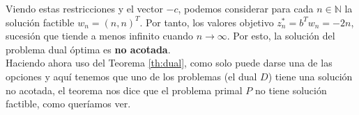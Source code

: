 \documentclass[a4paper]{article}
\begin{document}
Viendo estas restricciones y el vector \(-c\), podemos considerar para cada \(n \in \mathbb N\) la solución factible \(w_{n} = (n,n)^{T}\). Por tanto, los valores objetivo \(z_{n}^{*} = b^{T}w_{n} = -2n\), sucesión que tiende a menos infinito cuando \(n \to \infty\). Por esto, la solución del problema dual óptima es \textbf{no acotada}.\\

Haciendo ahora uso del Teorema \ref{th:dual}, como solo puede darse una de las opciones y aquí tenemos que uno de los problemas (el dual \(D\)) tiene una solución no acotada, el teorema nos dice que el problema primal \(P\) no tiene solución factible, como queríamos ver.
\end{document}
